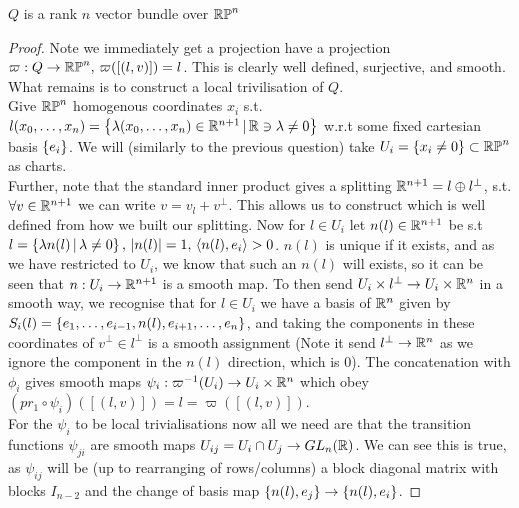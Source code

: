 \documentclass{article}
\begin{document}
\begin{prop}
$Q$ is a rank $n$ vector bundle over $\mathbb{RP}^n$
\end{prop}
\begin{proof}
Note we immediately get a projection have a projection $\varpi : Q \to \mathbb{RP}^n, \, \varpi([(l,v)]) = l$. This is clearly well defined, surjective, and smooth. What remains is to construct a local trivilisation of $Q$. \\
Give $\mathbb{RP}^n$ homogenous coordinates $x_i$ s.t. $l(x_0, \dots, x_n) = \left\{ \lambda(x_0, \dots, x_n)\in \mathbb{R}^{n+1} \, | \, \mathbb{R} \ni \lambda \neq 0 \right\}$ w.r.t some fixed cartesian basis $\left\{ e_i \right\}$. We will (similarly to the previous question) take $U_i = \left\{ x_i \neq 0 \right\} \subset \mathbb{RP}^n$ as charts. \\
Further, note that the standard inner product gives a splitting $\mathbb{R}^{n+1} = l \oplus l^\perp$, s.t. $\forall v \in \mathbb{R}^{n+1}$ we can write $v=v_l + v^\perp$. This allows us to construct 
which is well defined from how we built our splitting. Now for $l \in U_i$ let $n(l)\in \mathbb{R}^{n+1}$ be s.t $l = \left\{ \lambda n(l) \, | \, \lambda \neq 0 \right\}, \, \left\lvert n(l) \right\rvert = 1, \, \left\langle n(l),e_i \right\rangle > 0$. $n(l)$ is unique if it exists, and as we have restricted to $U_i$, we know that such an $n(l)$ will exists, so it can be seen that $n : U_i \to \mathbb{R}^{n+1}$ is a smooth map. To then send $U_i \times l^\perp \to U_i \times \mathbb{R}^n$ in a smooth way, we recognise that for $l \in U_i$ we have a basis of $\mathbb{R}^n$ given by $S_{i}(l) = \left\{ e_1, \dots, e_{i-1},n(l),e_{i+1}, \dots, e_n \right\}$, and taking the components in these coordinates of $v^\perp \in l^\perp$ is a smooth assignment (Note it send $l^\perp \to \mathbb{R}^n$ as we ignore the component in the $n(l)$ direction, which is 0). The concatenation with $\phi_i$ gives smooth maps $\psi_i : \varpi^{-1}(U_i) \to U_i \times \mathbb{R}^n$ which obey $(pr_1 \circ \psi_i)([(l,v)]) = l = \varpi([(l,v)])$. \\
For the $\psi_i$ to be local trivialisations now all we need are that the transition functions $\psi_{ji}$ are smooth maps $U_{ij} = U_i \cap U_j \to GL_n(\mathbb{R})$. We can see this is true, as $\psi_{ij}$  will be (up to rearranging of rows/columns) a block diagonal matrix with blocks $I_{n-2}$ and the change of basis map $\left\{ n(l),e_j \right\}\to \left\{ n(l),e_i \right\}$. 
\end{proof}
\end{document}
